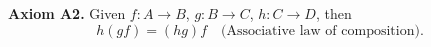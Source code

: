\textbf{Axiom A2.} Given $f: A \to B$, $g: B \to C$, $h: C \to D$, then
$$h(gf) = (hg)f \quad \text{(Associative law of composition)}.$$
